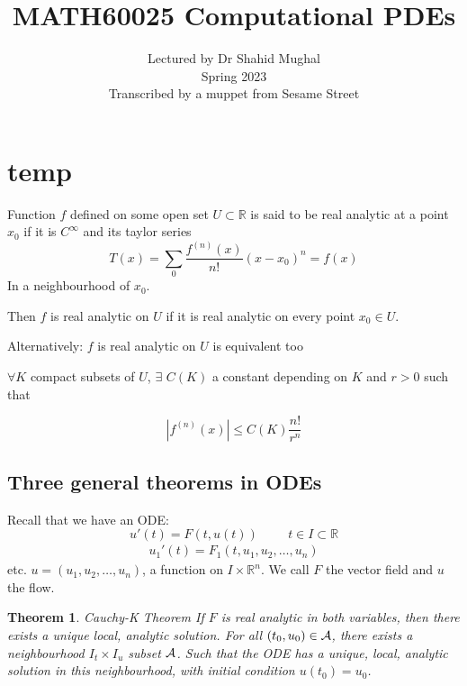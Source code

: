 \documentclass{article}
\title{MATH60025 Computational PDEs}
\author{Lectured by Dr Shahid Mughal\\
Spring 2023\\
Transcribed by a muppet from Sesame Street
}
\date{}
\numberwithin{equation}{section}
\newtheorem{theorem}{Theorem}[section]
\theoremstyle{definition}
\newcommand{\R}{\mathbb{R}}
\begin{document}
\maketitle






\section{temp}

Function $f$ defined on some open set $U\subset\R$ is said to be real analytic at a point $x_0$ if it is $C^{\infty}$ and its taylor series
\begin{equation}
    T(x) = \sum_{0} \frac{f^{(n)}(x)}{n!}(x-x_0)^n = f(x)
\end{equation}
In a neighbourhood of $x_0$.

Then $f$ is real analytic on $U$ if it is real analytic on every point $x_0 \in U$.

Alternatively: $f$ is real analytic on $U$ is equivalent too

$\forall K$ compact subsets of $U$, $\exists$ $C(K)$ a constant depending on $K$ and $r>0$ such that

\begin{equation}
    |f^{(n)}(x)| \leq C(K) \frac{n!}{r^n}
\end{equation}

\subsection{Three general theorems in ODEs}
Recall that we have an ODE:
\begin{equation}
    u'(t) = F(t,u(t)) \hspace{1cm} t \in I \subset \R
\end{equation}
\begin{align}
    u_1'(t) = F_1(t,u_1,u_2,\dots,u_n)
\end{align}
etc.
$u = (u_1,u_2,\dots,u_n)$, a function on $I \times \R^n$.
We call $F$ the vector field and $u$ the flow.

\begin{theorem}Cauchy-K Theorem
    If $F$ is real analytic in both variables, then there exists a unique local, analytic solution. For all $(t_0,u_0) \in \cal{A}$, there exists a neighbourhood $I_t \times I_u$ subset $\cal{A}$. Such that the ODE has a unique, local, analytic solution in this neighbourhood, with initial condition $u(t_0) = u_0$.
\end{theorem}
\end{document}
